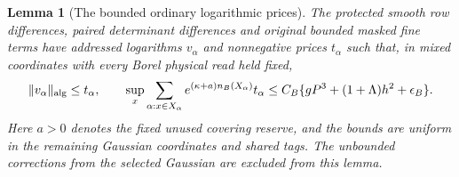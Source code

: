 \documentclass[11pt,reqno]{amsart}
\numberwithin{equation}{section}
\newtheorem{lemma}[theorem]{Lemma}
\theoremstyle{definition}
\theoremstyle{remark}
\begin{document}
\begin{lemma}[The bounded ordinary logarithmic prices]
\label{lem:central-bounded-logs}
The protected smooth row differences, paired determinant
differences and original bounded masked fine terms have
addressed logarithms \(v_\alpha\) and nonnegative prices
\(t_\alpha\) such that, in mixed coordinates with every Borel
physical read held fixed,
\begin{equation}
 \|v_\alpha\|_{\rm alg}\le t_\alpha,\qquad
 \sup_x\sum_{\alpha:x\in X_\alpha}
    e^{(\kappa+a)n_B(X_\alpha)}t_\alpha
       \le C_B\{gP^3+(1+\Lambda)h^2+\epsilon_B\}.
 \label{eq:central-bounded-log-income}
\end{equation}
Here \(a>0\) denotes the fixed unused covering reserve, and
the bounds are uniform in the remaining Gaussian coordinates
and shared tags. The unbounded corrections from the selected
Gaussian are excluded from this lemma.
\end{lemma}
\end{document}
